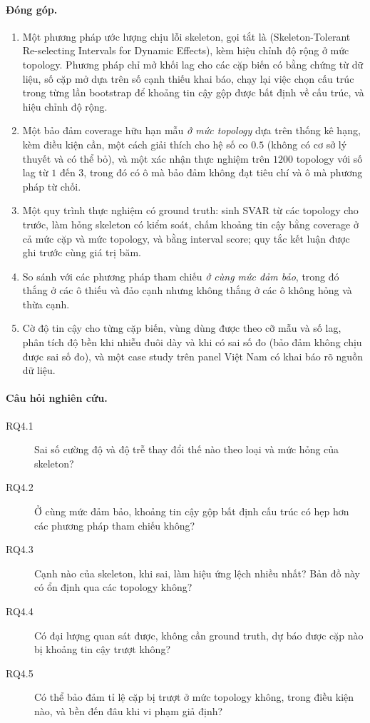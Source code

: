 \paragraph{Đóng góp.}
\begin{enumerate}
  \item Một phương pháp ước lượng chịu lỗi skeleton, gọi tắt là \ours{} (Skeleton-Tolerant Re-selecting Intervals for Dynamic Effects), kèm hiệu chỉnh độ rộng ở mức topology. Phương pháp chỉ mở khối lag cho các cặp biến có bằng chứng từ dữ liệu, số cặp mở dựa trên số cạnh thiếu khai báo, chạy lại việc chọn cấu trúc trong từng lần bootstrap để khoảng tin cậy gộp được bất định về cấu trúc, và hiệu chỉnh độ rộng.
  \item Một bảo đảm coverage hữu hạn mẫu \emph{ở mức topology} dựa trên thống kê hạng, kèm điều kiện cần, một cách giải thích cho hệ số co $0.5$ (không có cơ sở lý thuyết và có thể bỏ), và một xác nhận thực nghiệm trên $1200$ topology với số lag từ $1$ đến $3$, trong đó có ô mà bảo đảm không đạt tiêu chí và ô mà phương pháp từ chối.
  \item Một quy trình thực nghiệm có ground truth: sinh SVAR từ các topology cho trước, làm hỏng skeleton có kiểm soát, chấm khoảng tin cậy bằng coverage ở cả mức cặp và mức topology, và bằng interval score; quy tắc kết luận được ghi trước cùng giá trị băm.
  \item So sánh \ours{} với các phương pháp tham chiếu \emph{ở cùng mức đảm bảo}, trong đó \ours{} thắng ở các ô thiếu và đảo cạnh nhưng không thắng ở các ô không hỏng và thừa cạnh.
  \item Cờ độ tin cậy cho từng cặp biến, vùng dùng được theo cỡ mẫu và số lag, phân tích độ bền khi nhiễu đuôi dày và khi có sai số đo (bảo đảm không chịu được sai số đo), và một case study trên panel Việt Nam có khai báo rõ nguồn dữ liệu.
\end{enumerate}

\paragraph{Câu hỏi nghiên cứu.}
\begin{description}
  \item[RQ4.1] Sai số cường độ và độ trễ thay đổi thế nào theo loại và mức hỏng của skeleton?
  \item[RQ4.2] Ở cùng mức đảm bảo, khoảng tin cậy gộp bất định cấu trúc có hẹp hơn các phương pháp tham chiếu không?
  \item[RQ4.3] Cạnh nào của skeleton, khi sai, làm hiệu ứng lệch nhiều nhất? Bản đồ này có ổn định qua các topology không?
  \item[RQ4.4] Có đại lượng quan sát được, không cần ground truth, dự báo được cặp nào bị khoảng tin cậy trượt không?
  \item[RQ4.5] Có thể bảo đảm tỉ lệ cặp bị trượt ở mức topology không, trong điều kiện nào, và bền đến đâu khi vi phạm giả định?
\end{description}

